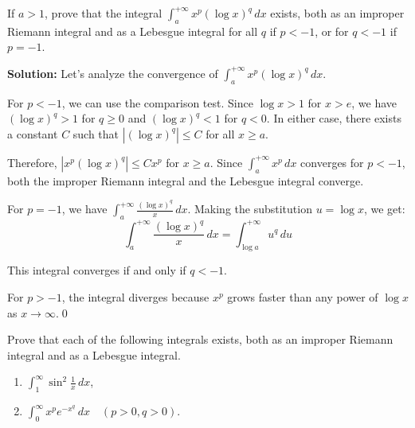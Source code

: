 \begin{problembox}
If $a > 1$, prove that the integral $\int_{a}^{+\infty} x^p (\log x)^q \, dx$ exists, both as an improper Riemann integral and as a Lebesgue integral for all $q$ if $p < -1$, or for $q < -1$ if $p = -1$.
\end{problembox}

\noindent\textbf{Solution:}
Let's analyze the convergence of $\int_{a}^{+\infty} x^p (\log x)^q \, dx$.

For $p < -1$, we can use the comparison test. Since $\log x > 1$ for $x > e$, we have $(\log x)^q > 1$ for $q \geq 0$ and $(\log x)^q < 1$ for $q < 0$. In either case, there exists a constant $C$ such that $|(\log x)^q| \leq C$ for all $x \geq a$.

Therefore, $|x^p (\log x)^q| \leq C x^p$ for $x \geq a$. Since $\int_{a}^{+\infty} x^p \, dx$ converges for $p < -1$, both the improper Riemann integral and the Lebesgue integral converge.

For $p = -1$, we have $\int_{a}^{+\infty} \frac{(\log x)^q}{x} \, dx$. Making the substitution $u = \log x$, we get:
\[\int_{a}^{+\infty} \frac{(\log x)^q}{x} \, dx = \int_{\log a}^{+\infty} u^q \, du\]

This integral converges if and only if $q < -1$.

For $p > -1$, the integral diverges because $x^p$ grows faster than any power of $\log x$ as $x \to \infty$.\qed


\begin{problembox}
Prove that each of the following integrals exists, both as an improper Riemann integral and as a Lebesgue integral.
\begin{enumerate}[label=(\alph*)]
    \item $\int_{1}^{\infty} \sin^2 \frac{1}{x} \, dx$,
    \item $\int_{0}^{\infty} x^pe^{-x^q} \, dx \quad (p > 0, q > 0)$.
\end{enumerate}
\end{problembox}

